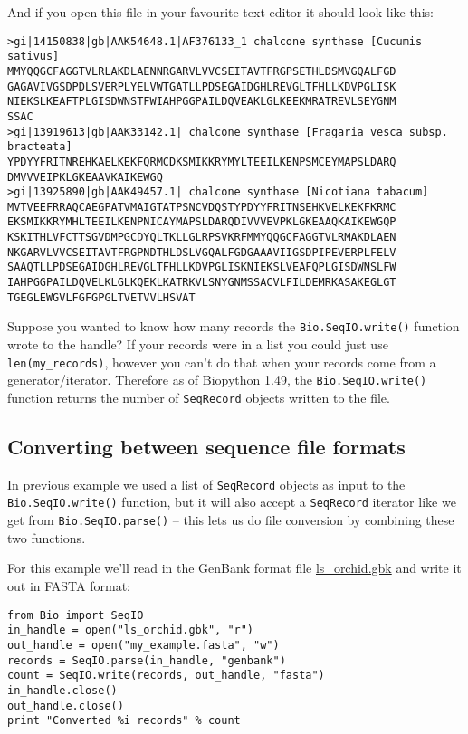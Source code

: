 \documentclass{report}
\begin{document}
\noindent And if you open this file in your favourite text editor it should look like this:

\begin{verbatim}
>gi|14150838|gb|AAK54648.1|AF376133_1 chalcone synthase [Cucumis sativus]
MMYQQGCFAGGTVLRLAKDLAENNRGARVLVVCSEITAVTFRGPSETHLDSMVGQALFGD
GAGAVIVGSDPDLSVERPLYELVWTGATLLPDSEGAIDGHLREVGLTFHLLKDVPGLISK
NIEKSLKEAFTPLGISDWNSTFWIAHPGGPAILDQVEAKLGLKEEKMRATREVLSEYGNM
SSAC
>gi|13919613|gb|AAK33142.1| chalcone synthase [Fragaria vesca subsp. bracteata]
YPDYYFRITNREHKAELKEKFQRMCDKSMIKKRYMYLTEEILKENPSMCEYMAPSLDARQ
DMVVVEIPKLGKEAAVKAIKEWGQ
>gi|13925890|gb|AAK49457.1| chalcone synthase [Nicotiana tabacum]
MVTVEEFRRAQCAEGPATVMAIGTATPSNCVDQSTYPDYYFRITNSEHKVELKEKFKRMC
EKSMIKKRYMHLTEEILKENPNICAYMAPSLDARQDIVVVEVPKLGKEAAQKAIKEWGQP
KSKITHLVFCTTSGVDMPGCDYQLTKLLGLRPSVKRFMMYQQGCFAGGTVLRMAKDLAEN
NKGARVLVVCSEITAVTFRGPNDTHLDSLVGQALFGDGAAAVIIGSDPIPEVERPLFELV
SAAQTLLPDSEGAIDGHLREVGLTFHLLKDVPGLISKNIEKSLVEAFQPLGISDWNSLFW
IAHPGGPAILDQVELKLGLKQEKLKATRKVLSNYGNMSSACVLFILDEMRKASAKEGLGT
TGEGLEWGVLFGFGPGLTVETVVLHSVAT
\end{verbatim}

Suppose you wanted to know how many records the \verb|Bio.SeqIO.write()| function wrote to the handle?
If your records were in a list you could just use \verb|len(my_records)|, however you can't do that when your records come from a generator/iterator.  Therefore as of Biopython 1.49, the \verb|Bio.SeqIO.write()| function returns the number of \verb|SeqRecord| objects written to the file.   

\subsection{Converting between sequence file formats}
\label{sec:SeqIO-conversion}

In previous example we used a list of \verb|SeqRecord| objects as input to the \verb|Bio.SeqIO.write()| function, but it will also accept a \verb|SeqRecord| iterator like we get from \verb|Bio.SeqIO.parse()| -- this lets us do file conversion by combining these two functions.

For this example we'll read in the GenBank format file \href{http://biopython.org/DIST/docs/tutorial/examples/ls_orchid.gbk}{ls\_orchid.gbk} and write it out in FASTA format:

\begin{verbatim}
from Bio import SeqIO
in_handle = open("ls_orchid.gbk", "r")
out_handle = open("my_example.fasta", "w")
records = SeqIO.parse(in_handle, "genbank")
count = SeqIO.write(records, out_handle, "fasta")
in_handle.close()
out_handle.close()
print "Converted %i records" % count
\end{verbatim}
\end{document}
